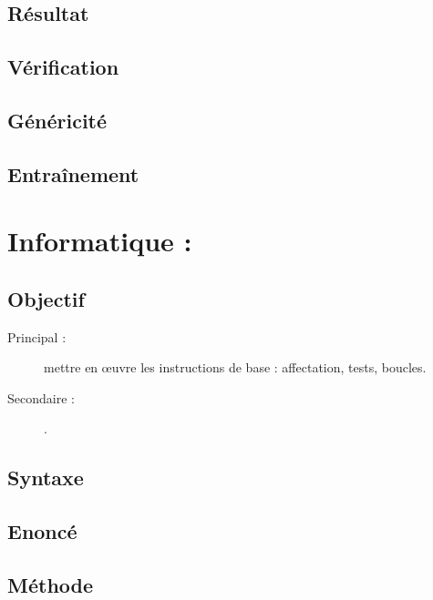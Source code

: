 \subsection{Résultat}\label{instructions:physique:resultat}

\subsection{Vérification}\label{instructions:physique:verification}

\subsection{Généricité}\label{instructions:physique:genericite}

\subsection{Entraînement}\label{instructions:physique:entrainement}

\section{Informatique : }\label{instructions:informatique}

\subsection{Objectif}\label{instructions:informatique:objectif}
\begin{description}
\item[Principal : ] mettre en \oe uvre les instructions de base : affectation, tests, boucles.
\item[Secondaire :] .
\end{description}


\subsection{Syntaxe \python}\label{instructions:informatique:python}

\subsection{Enoncé}\label{instructions:informatique:enonce}

\subsection{Méthode}\label{instructions:informatique:methode}

